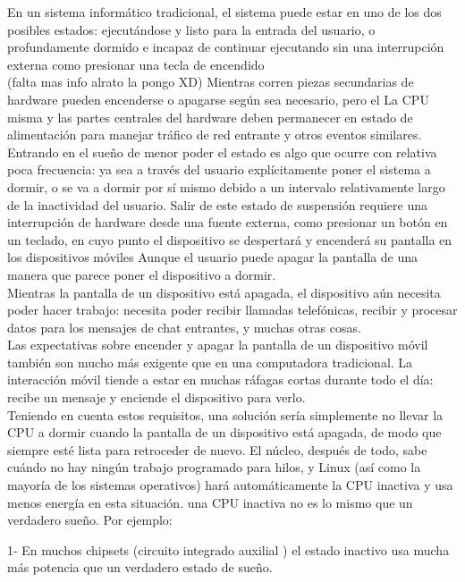 \documentclass[a4paper]{article}
\begin{document}
En un sistema informático tradicional, el sistema puede estar en uno de los dos posibles estados: ejecutándose y listo para la entrada del usuario, o profundamente dormido e incapaz de continuar ejecutando sin una interrupción externa como presionar una tecla de encendido\\
(falta mas info alrato la pongo XD)
Mientras corren piezas secundarias de hardware pueden encenderse o apagarse según sea necesario, pero el La CPU misma y las partes centrales del hardware deben permanecer en estado de alimentación para manejar tráfico de red entrante y otros eventos similares.\\

 Entrando en el sueño de menor poder el estado es algo que ocurre con relativa poca frecuencia: ya sea a través del usuario explícitamente
poner el sistema a dormir, o se va a dormir por sí mismo debido a un intervalo relativamente largo
de la inactividad del usuario. Salir de este estado de suspensión requiere una interrupción de hardware
desde una fuente externa, como presionar un botón en un teclado, en cuyo punto
el dispositivo se despertará y encenderá su pantalla
 en los dispositivos móviles  Aunque el usuario puede apagar la pantalla de una manera que parece poner el dispositivo a dormir.\\ Mientras la pantalla de un dispositivo está apagada, el dispositivo aún necesita
poder hacer trabajo: necesita poder recibir llamadas telefónicas, recibir y procesar
datos para los mensajes de chat entrantes, y muchas otras cosas.\\

Las expectativas sobre encender y apagar la pantalla de un dispositivo móvil también son
mucho más exigente que en una computadora tradicional. La interacción móvil tiende a
estar en muchas ráfagas cortas durante todo el día: recibe un mensaje y enciende el
dispositivo para verlo.\\
Teniendo en cuenta estos requisitos, una solución sería simplemente no llevar  la CPU a dormir cuando la pantalla de un dispositivo está apagada, de modo que siempre esté lista para retroceder de nuevo.  El núcleo, después de todo, sabe cuándo no hay ningún trabajo programado para hilos, y Linux (así como la mayoría de los sistemas operativos) hará automáticamente la CPU inactiva y usa menos energía en esta situación.
una CPU inactiva no es lo mismo que un verdadero sueño. Por ejemplo:

1-	En muchos chipsets (circuito integrado auxilial )  el estado inactivo usa mucha más potencia que un verdadero estado de sueño.
\end{document}
